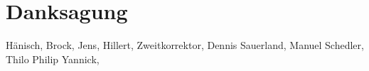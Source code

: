 \chapter*{Danksagung}
\label{sec:danksagung}
Hänisch, Brock, Jens, Hillert, Zweitkorrektor, Dennis Sauerland, Manuel Schedler, Thilo Philip Yannick,
